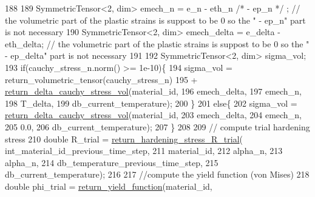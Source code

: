 \begin{DoxyCode}
188 
189         SymmetricTensor<2, dim> emech\_n = e\_n - eth\_n \textcolor{comment}{/* - ep\_n */} ; \textcolor{comment}{// the volumetric part of the plastic
       strains is suppost to be 0 so the " - ep\_n" part is not necessary}
190         SymmetricTensor<2, dim> emech\_delta = e\_delta - eth\_delta; \textcolor{comment}{// the volumetric part of the plastic
       strains is suppost to be 0 so the " - ep\_delta" part is not necessary}
191 
192         SymmetricTensor<2, dim> sigma\_vol;
193         \textcolor{keywordflow}{if}(cauchy\_stress\_n.norm() >= 1e-10)\{
194             sigma\_vol = return\_volumetric\_tensor(cauchy\_stress\_n)
195                         + \hyperlink{classConstitutive__Laws_1_1Thermo__Elasto__Plastic_a5339549a71ccf35f14b23c3286359fa3}{return\_delta\_cauchy\_stress\_vol}(material\_id,
196                                                          emech\_delta,
197                                                          emech\_n,
198                                                          T\_delta,
199                                                          db\_current\_temperature);
200         \}
201         \textcolor{keywordflow}{else}\{
202             sigma\_vol = \hyperlink{classConstitutive__Laws_1_1Thermo__Elasto__Plastic_a5339549a71ccf35f14b23c3286359fa3}{return\_delta\_cauchy\_stress\_vol}(material\_id,
203                                                        emech\_delta,
204                                                        emech\_n,
205                                                        0.0,
206                                                        db\_current\_temperature);
207         \}
208 
209         \textcolor{comment}{// compute trial hardening stress}
210         \textcolor{keywordtype}{double} R\_trial = \hyperlink{classConstitutive__Laws_1_1Thermo__Elasto__Plastic_aac67a72f1a65a55f2b155aabb9def3c5}{return\_hardening\_stress\_R\_trial}(
      int\_material\_id\_previous\_time\_step,
211                                                          material\_id,
212                                                          alpha\_n,
213                                                          alpha\_n,
214                                                          db\_temperature\_previous\_time\_step,
215                                                          db\_current\_temperature);
216 
217         \textcolor{comment}{//compute the yield function (von Mises)}
218         \textcolor{keywordtype}{double} phi\_trial = \hyperlink{classConstitutive__Laws_1_1Thermo__Elasto__Plastic_ae5bc0affd62bea77637f34f641047831}{return\_yield\_function}(material\_id,

\end{DoxyCode}
